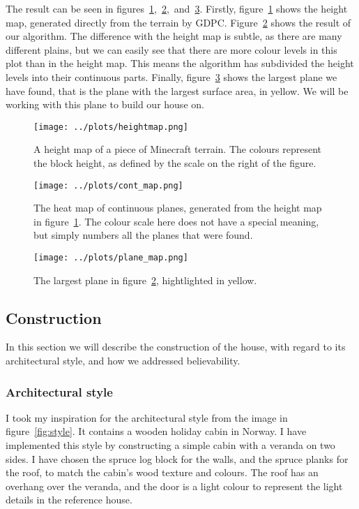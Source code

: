 \documentclass[10pt]{article}
\begin{document}
The result can be seen in figures~\ref{fig:heightmap},~\ref{fig:cont_map},~and~\ref{fig:plane_map}. Firstly, figure~\ref{fig:heightmap} shows the height map, generated directly from the terrain by GDPC. Figure~\ref{fig:cont_map} shows the result of our algorithm. The difference with the height map is subtle, as there are many different plains, but we can easily see that there are more colour levels in this plot than in the height map. This means the algorithm has subdivided the height levels into their continuous parts. Finally, figure~\ref{fig:plane_map} shows the largest plane we have found, that is the plane with the largest surface area, in yellow. We will be working with this plane to build our house on.

\begin{figure}
    \texttt{[image: ../plots/heightmap.png]}
    \centering
    \caption{A height map of a piece of Minecraft terrain. The colours represent the block height, as defined by the scale on the right of the figure.}
    \label{fig:heightmap}
\end{figure}
\begin{figure}
    \texttt{[image: ../plots/cont\_map.png]}
    \centering
    \caption{The heat map of continuous planes, generated from the height map in figure~\ref{fig:heightmap}. The colour scale here does not have a special meaning, but simply numbers all the planes that were found.}
    \label{fig:cont_map}
\end{figure}
\begin{figure}
    \texttt{[image: ../plots/plane\_map.png]}
    \centering
    \caption{The largest plane in figure~\ref{fig:cont_map}, hightlighted in yellow.}
    \label{fig:plane_map}
\end{figure}

\subsection{Construction}
In this section we will describe the construction of the house, with regard to its architectural style, and how we addressed believability.
\subsubsection{Architectural style}

I took my inspiration for the architectural style from the image in figure~\ref{fig:style}. It contains a wooden holiday cabin in Norway. I have implemented this style by constructing a simple cabin with a veranda on two sides. I have chosen the spruce log block for the walls, and the spruce planks for the roof, to match the cabin's wood texture and colours. The roof has an overhang over the veranda, and the door is a light colour to represent the light details in the reference house. %
\end{document}
